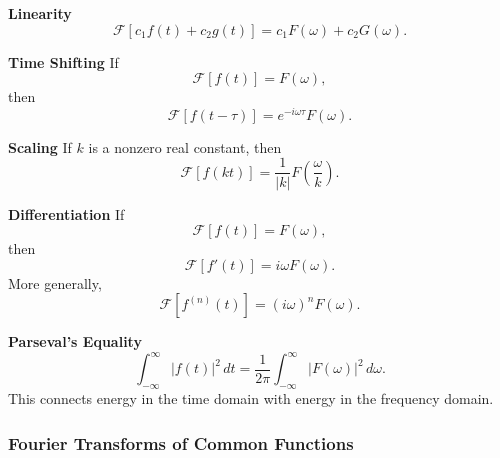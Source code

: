 \begin{conceptbox}
    \textbf{Linearity}
    \[
        \mathcal{F}[c_1f(t)+c_2g(t)]
        =
        c_1F(\omega)+c_2G(\omega).
    \]
\end{conceptbox}

\begin{conceptbox}
    \textbf{Time Shifting}
    If
    \[
        \mathcal{F}[f(t)]=F(\omega),
    \]
    then
    \[
        \mathcal{F}[f(t-\tau)]
        =
        e^{-i\omega\tau}F(\omega).
    \]
\end{conceptbox}

\begin{conceptbox}
    \textbf{Scaling}
    If $k$ is a nonzero real constant, then
    \[
        \mathcal{F}[f(kt)]
        =
        \frac{1}{|k|}F\left(\frac{\omega}{k}\right).
    \]
\end{conceptbox}

\begin{conceptbox}
    \textbf{Differentiation}
    If
    \[
        \mathcal{F}[f(t)]=F(\omega),
    \]
    then
    \[
        \mathcal{F}[f'(t)] = i\omega F(\omega).
    \]
    More generally,
    \[
        \mathcal{F}[f^{(n)}(t)] = (i\omega)^nF(\omega).
    \]
\end{conceptbox}

\begin{conceptbox}
    \textbf{Parseval's Equality}
    \[
        \int_{-\infty}^{\infty}|f(t)|^2\,dt
        =
        \frac{1}{2\pi}
        \int_{-\infty}^{\infty}|F(\omega)|^2\,d\omega.
    \]
    This connects energy in the time domain with energy in the frequency domain.
\end{conceptbox}

\subsubsection*{Fourier Transforms of Common Functions}

